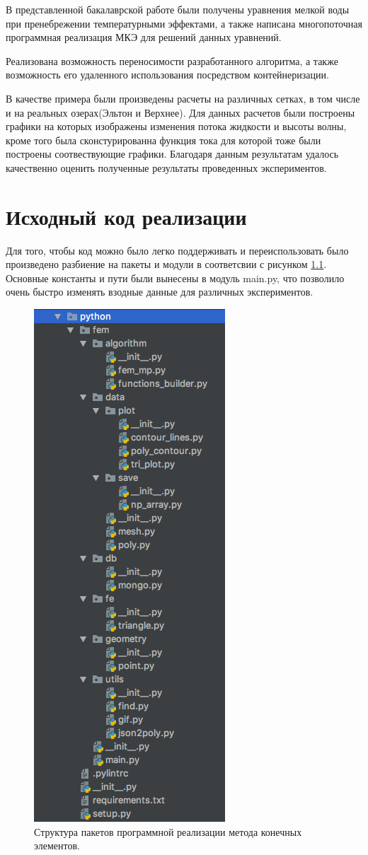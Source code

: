 \documentclass[14pt]{extreport}
\begin{document}
\conclusions

В представленной бакалаврской работе были получены уравнения мелкой воды при пренебрежении температурными эффектами, а также написана многопоточная программная реализация МКЭ для решений данных уравнений.

Реализована возможность переносимости разработанного алгоритма, а также возможность его удаленного использования посредством контейнеризации.

В качестве примера были произведены расчеты на различных сетках, в том числе и на реальных озерах(Эльтон и Верхнее). Для данных расчетов были построены графики на которых изображены изменения потока жидкости и высоты волны, кроме того была сконстурированна функция тока для которой тоже были построены соотвествующие графики. Благодаря данным результатам удалось качественно оценить полученные результаты проведенных экспериментов.




\Appendix

\chapter{Исходный код реализации}

Для того, чтобы код можно было легко поддерживать и переиспользовать было произведено разбиение на пакеты и модули в соответсвии с рисунком \ref{img:code:struct}. Основные константы и пути были вынесены в модуль main.py, что позволило очень быстро изменять взодные данные для различных экспериментов.

\begin{figure}[H]
\centerline{
\includegraphics[width=0.4\linewidth]{images/code_struct}}
\caption{Структура пакетов программной реализации метода конечных элементов.}
\label{img:code:struct}
\end{figure}
\end{document}
